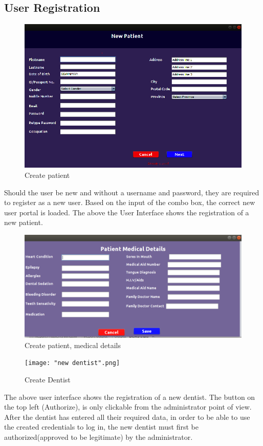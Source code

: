 \documentclass[11 pt]{article}
\begin{document}
\subsection{User Registration}
\begin{figure}[h]
\centering
\includegraphics[width=\linewidth]{UI_create_ patient.png}
\caption{Create patient}
\label{fig:create_patient}
\end{figure}
Should the user be new and without a username and password, they are required to register as a new user. Based on the input of the combo box, the correct new user portal is loaded. The above the User Interface shows the registration of a new patient.
\begin{figure}[h]
\centering
\includegraphics[width=\linewidth]{patientmedicalcond.png}
\caption{Create patient, medical details}
\label{fig:Patient Medical details}
\end{figure}
\begin{figure}[h]
\clearpage
\centering
\texttt{[image: "new dentist".png]}
\caption{Create Dentist}
\label{fig:Create New Dentist}
\end{figure}
The above user interface shows the registration of a new dentist. The button on the top left (Authorize), is only clickable from the administrator point of view. After the dentist has entered all their required data, in order to be able to use the created credentials to log in, the new dentist must first be authorized(approved to be legitimate) by the administrator.
\end{document}
